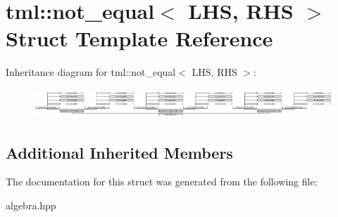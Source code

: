 \hypertarget{structtml_1_1not__equal}{\section{tml\+:\+:not\+\_\+equal$<$ L\+H\+S, R\+H\+S $>$ Struct Template Reference}
\label{structtml_1_1not__equal}
}
Inheritance diagram for tml\+:\+:not\+\_\+equal$<$ L\+H\+S, R\+H\+S $>$\+:\begin{figure}[H]
\begin{center}
\leavevmode
\includegraphics[height=1.103604cm]{structtml_1_1not__equal}
\end{center}
\end{figure}
\subsection*{Additional Inherited Members}


The documentation for this struct was generated from the following file\+:\begin{DoxyCompactItemize}
\item 
algebra.\+hpp\end{DoxyCompactItemize}
